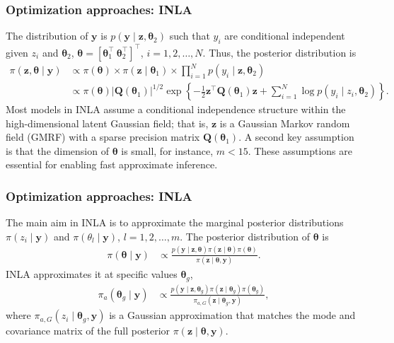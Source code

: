 \documentclass[12pt, compress]{beamer}
\begin{document}
\begin{frame}
	\frametitle{Optimization approaches: INLA}
The distribution of $\boldsymbol{y}$ is $p(\boldsymbol{y}\mid \boldsymbol{z},\boldsymbol{\theta}_2)$ such that $y_i$ are conditional independent given $z_i$ and $\boldsymbol{\theta}_2$, $\boldsymbol{\theta}=[\boldsymbol{\theta}_1^{\top} \ \boldsymbol{\theta}_2^{\top}]^{\top}$, $i=1,2,\dots,N$. Thus, the posterior distribution is
{\footnotesize{
\begin{align}\label{eq:INLA1}
	\pi(\boldsymbol{z},\boldsymbol{\theta}\mid \boldsymbol{y})&\propto \pi(\boldsymbol{\theta})\times \pi(\boldsymbol{z}\mid \boldsymbol{\theta}_1)\times \prod_{i=1}^{N}p(y_i\mid \boldsymbol{z},\boldsymbol{\theta}_2)\\
	&\propto \pi(\boldsymbol{\theta})|\boldsymbol{Q}(\boldsymbol{\theta}_1)|^{1/2}\exp\left\{-\frac{1}{2}\boldsymbol{z}^{\top}\boldsymbol{Q}(\boldsymbol{\theta}_1)\boldsymbol{z}+\sum_{i=1}^N\log p(y_i\mid z_i,\boldsymbol{\theta}_2)\right\}.\nonumber
\end{align}
}}
Most models in INLA assume a conditional independence structure within the high-dimensional latent Gaussian field; that is, $\boldsymbol{z}$ is a Gaussian Markov random field (GMRF) with a sparse precision matrix $\boldsymbol{Q}(\boldsymbol{\theta}_1)$. A second key assumption is that the dimension of $\boldsymbol{\theta}$ is small, for instance, $m < 15$. These assumptions are essential for enabling fast approximate inference.

\end{frame}

\begin{frame}
	\frametitle{Optimization approaches: INLA}
The main aim in INLA is to approximate the marginal posterior distributions $\pi(z_i\mid \boldsymbol{y})$ and $\pi(\theta_l\mid \boldsymbol{y})$, $l=1,2,\dots,m$.
The posterior distribution of $\boldsymbol{\theta}$ is
\begin{align*}	
	\pi(\boldsymbol{\theta}\mid \boldsymbol{y})&\propto\frac{p(\boldsymbol{y}\mid \boldsymbol{z},\boldsymbol{\theta})\pi(\boldsymbol{z}\mid\boldsymbol{\theta})\pi(\boldsymbol{\theta})}{\pi(\boldsymbol{z}\mid \boldsymbol{\theta},\boldsymbol{y})}.
\end{align*}
INLA approximates it at specific values $\boldsymbol{\theta}_g$,
\begin{align*}
	\pi_a(\boldsymbol{\theta}_g\mid \boldsymbol{y})&\propto\frac{p(\boldsymbol{y}\mid \boldsymbol{z},\boldsymbol{\theta}_g)\pi(\boldsymbol{z}\mid\boldsymbol{\theta}_g)\pi(\boldsymbol{\theta}_g)}{\pi_{a,G}(\boldsymbol{z}\mid \boldsymbol{\theta}_g,\boldsymbol{y})},
\end{align*} 
where $\pi_{a,G}(z_i \mid \boldsymbol{\theta}_g, \boldsymbol{y})$ is a Gaussian approximation that matches the mode and covariance matrix of the full posterior $\pi(\boldsymbol{z} \mid \boldsymbol{\theta}, \boldsymbol{y})$. 
\end{frame}
\end{document}
